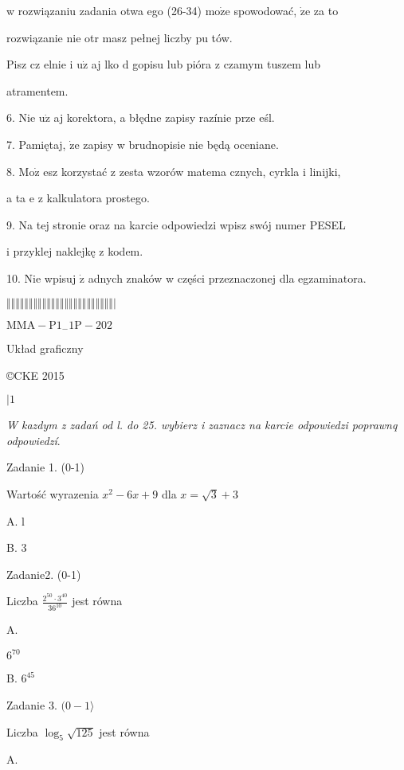 \documentclass[a4paper,12pt]{article}
\begin{document}
w rozwiązaniu zadania otwa ego (26-34) $\mathrm{m}\mathrm{o}\dot{\mathrm{z}}\mathrm{e}$ spowodować, $\dot{\mathrm{z}}\mathrm{e}$ za to

rozwiązanie nie otr masz pełnej liczby pu tów.

Pisz cz elnie i $\mathrm{u}\dot{\mathrm{z}}$ aj lko $\mathrm{d}$ gopisu lub pióra z czamym tuszem lub

atramentem.

6. Nie $\mathrm{u}\dot{\mathrm{z}}$ aj korektora, a błędne zapisy razínie prze eśl.

7. Pamiętaj, $\dot{\mathrm{z}}\mathrm{e}$ zapisy w brudnopisie nie będą oceniane.

8. $\mathrm{M}\mathrm{o}\dot{\mathrm{z}}$ esz korzystać z zesta wzorów matema cznych, cyrkla i linijki,

a ta $\mathrm{e}$ z kalkulatora prostego.

9. Na tej stronie oraz na karcie odpowiedzi wpisz swój numer PESEL

i przyklej naklejkę z kodem.

10. Nie wpisuj $\dot{\mathrm{z}}$ adnych znaków w części przeznaczonej dla egzaminatora.

$\Vert\Vert\Vert\Vert\Vert\Vert\Vert\Vert\Vert\Vert\Vert\Vert\Vert\Vert\Vert\Vert\Vert\Vert\Vert\Vert\Vert\Vert\Vert\Vert|$

$\mathrm{M}\mathrm{M}\mathrm{A}-\mathrm{P}1_{-}1\mathrm{P}-202$

Układ graficzny

\copyright CKE 2015

$| 1$




{\it W kazdym z zadań od l. do 25. wybierz i zaznacz na karcie odpowiedzi poprawnq odpowiedzí}.

Zadanie 1. (0-1)

Wartość wyrazenia $x^{2}-6x+9$ dla $x=\sqrt{3}+3$

A. l

B. 3

Zadanie2. (0-1)

Liczba $\displaystyle \frac{2^{50}\cdot 3^{40}}{36^{10}}$ jest równa

A.

$6^{70}$

B. $6^{45}$

Zadanie 3. $(0-1\rangle$

Liczba $\log_{5}\sqrt{125}$ jest równa

A.
\end{document}
